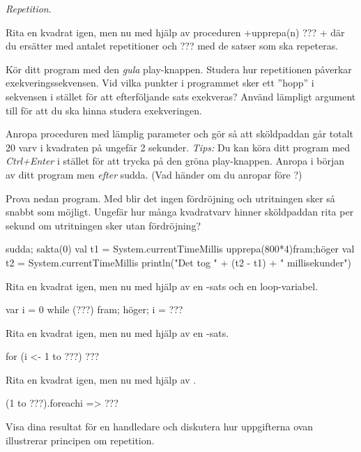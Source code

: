 \Task \textit{Repetition}.

\Subtask Rita en kvadrat igen, men nu med hjälp av proceduren \code+upprepa(n){ ??? }+ där du ersätter  med antalet repetitioner och ??? med de satser som ska repeteras.

\Subtask Kör ditt program med den \emph{gula} play-knappen. Studera hur repetitionen påverkar  exekveringssekvensen. Vid vilka punkter i programmet sker ett ''hopp'' i sekvensen i stället för att efterföljande sats exekveras? Använd lämpligt argument till  för att du ska hinna studera exekveringen.

\Subtask Anropa proceduren  med lämplig parameter och gör så att sköldpaddan går totalt 20 varv i kvadraten på ungefär 2 sekunder. \emph{Tips:} Du kan köra ditt program med \emph{Ctrl+Enter} i stället för att trycka på den gröna play-knappen. Anropa  i början av ditt program men \emph{efter} sudda. (Vad händer om du anropar  före ?)


\Subtask Prova nedan program. Med  blir det ingen fördröjning och utritningen sker så snabbt som möjligt. Ungefär hur många kvadratvarv hinner sköldpaddan rita per sekund om utritningen sker utan fördröjning? 
\begin{Code}
sudda; sakta(0)
val t1 = System.currentTimeMillis
upprepa(800*4){fram;höger}
val t2 = System.currentTimeMillis
println("Det tog " + (t2 - t1) + " millisekunder")
\end{Code}



\Subtask Rita en kvadrat igen, men nu med hjälp av en -sats och en loop-variabel.

\begin{Code}
var i = 0
while (???) {fram; höger; i = ???}
\end{Code}

\Subtask Rita en kvadrat igen, men nu med hjälp av en -sats.

\begin{Code}
for (i <- 1 to ???) {???}
\end{Code}

\Subtask Rita en kvadrat igen, men nu med hjälp av .

\begin{Code}
(1 to ???).foreach{i => ???}
\end{Code}

\Subtask\Checkpoint Visa dina resultat för en handledare och diskutera hur uppgifterna ovan illustrerar principen om repetition.
 


